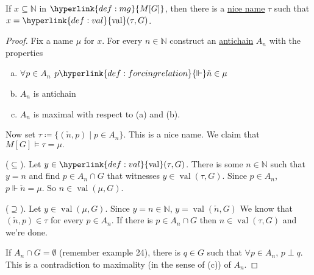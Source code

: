 \documentclass{article}
\newcommand{\1}{\mathbbm{1}}
\DeclareMathOperator{\val}{val}
\let\models\vDash
\let\forces\Vdash
\begin{document}
\begin{thm}
  If $x \subseteq \mathbb{N}$ in $\hyperlink{def:mg}{M[G]}$, then there is a \hyperlink{def:nicename}{nice name} $\tau$ such that $x = \hyperlink{def:val}{\val}(\tau,G)$.
\end{thm}
\begin{proof}
  Fix a name $\mu$ for $x$.
  For every $n \in \mathbb{N}$ construct an \hyperlink{def:antichain}{antichain} $A_n$ with the properties
  \begin{enumerate}[(a)]
    \item $\forall p \in A_n$ $p \hyperlink{def:forcingrelation}{\forces} \check{n} \in \mu$
    \item $A_n$ is antichain
    \item $A_n$ is maximal with respect to (a) and (b).
  \end{enumerate}
  Now set $\tau \coloneqq \{(\check{n},p) \mid p \in A_n\}$. This is a nice name.
  We claim that $M[G] \models \tau = \mu.$

  ($\subseteq$). Let $y \in \hyperlink{def:val}{\val}(\tau,G)$. There is some $n \in \mathbb{N}$ such that $y = n$ and find $p \in A_n \cap G$ that witnesses $y \in \val(\tau,G)$.
  Since $p \in A_n$, $p \forces \check{n} = \mu$.
  So $n \in \val(\mu,G)$.

  ($\supseteq$). Let $y \in \val(\mu,G)$. Since $y =n \in \mathbb{N}$, $y = \val(\check{n},G)$
  We know that $(\check{n},p) \in \tau$ for every $p \in A_n$. If there is $p \in A_n \cap G$ then $n \in \val(\tau,G)$ and we're done.

  If $A_n \cap G = \emptyset$ (remember example 24), there is $q \in G$ such that $\forall p \in A_n$, $p \perp q$.
  This is a contradiction to maximality (in the sense of (c)) of $A_n$.
\end{proof}
\end{document}
